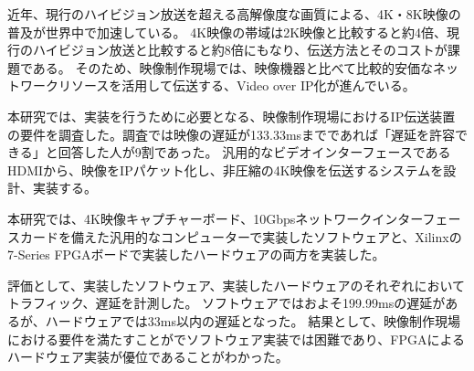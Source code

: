 
\begin{jabstract}

近年、現行のハイビジョン放送を超える高解像度な画質による、4K・8K映像の普及が世界中で加速している。
4K映像の帯域は2K映像と比較すると約4倍、現行のハイビジョン放送と比較すると約8倍にもなり、伝送方法とそのコストが課題である。
そのため、映像制作現場では、映像機器と比べて比較的安価なネットワークリソースを活用して伝送する、Video over IP化が進んでいる。

本研究では、実装を行うために必要となる、映像制作現場におけるIP伝送装置の要件を調査した。調査では映像の遅延が133.33msまでであれば「遅延を許容できる」と回答した人が9割であった。
汎用的なビデオインターフェースであるHDMIから、映像をIPパケット化し、非圧縮の4K映像を伝送するシステムを設計、実装する。

本研究では、4K映像キャプチャーボード、10Gbpsネットワークインターフェースカードを備えた汎用的なコンピューターで実装したソフトウェアと、Xilinxの7-Series FPGAボードで実装したハードウェアの両方を実装した。

評価として、実装したソフトウェア、実装したハードウェアのそれぞれにおいてトラフィック、遅延を計測した。
ソフトウェアではおよそ199.99msの遅延があるが、ハードウェアでは33ms以内の遅延となった。
結果として、映像制作現場における要件を満たすことがでソフトウェア実装では困難であり、FPGAによるハードウェア実装が優位であることがわかった。

\end{jabstract}


